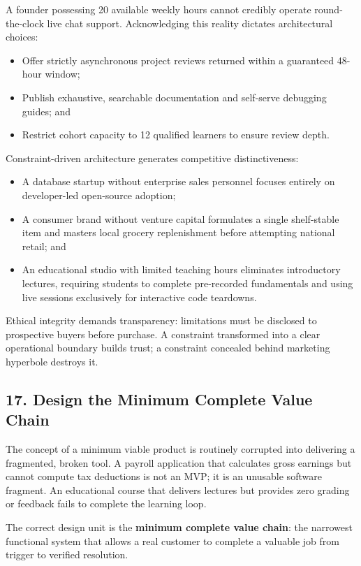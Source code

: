 A founder possessing 20 available weekly hours cannot credibly operate round-the-clock live chat support. Acknowledging this reality dictates architectural choices:
\begin{itemize}
    \item Offer strictly asynchronous project reviews returned within a guaranteed 48-hour window;
    \item Publish exhaustive, searchable documentation and self-serve debugging guides; and
    \item Restrict cohort capacity to 12 qualified learners to ensure review depth.
\end{itemize}

Constraint-driven architecture generates competitive distinctiveness:
\begin{itemize}
    \item A database startup without enterprise sales personnel focuses entirely on developer-led open-source adoption;
    \item A consumer brand without venture capital formulates a single shelf-stable item and masters local grocery replenishment before attempting national retail; and
    \item An educational studio with limited teaching hours eliminates introductory lectures, requiring students to complete pre-recorded fundamentals and using live sessions exclusively for interactive code teardowns.
\end{itemize}

Ethical integrity demands transparency: limitations must be disclosed to prospective buyers before purchase. A constraint transformed into a clear operational boundary builds trust; a constraint concealed behind marketing hyperbole destroys it.

\subsection*{17. Design the Minimum Complete Value Chain}

The concept of a minimum viable product is routinely corrupted into delivering a fragmented, broken tool. A payroll application that calculates gross earnings but cannot compute tax deductions is not an MVP; it is an unusable software fragment. An educational course that delivers lectures but provides zero grading or feedback fails to complete the learning loop.

The correct design unit is the \textbf{minimum complete value chain}: the narrowest functional system that allows a real customer to complete a valuable job from trigger to verified resolution.

